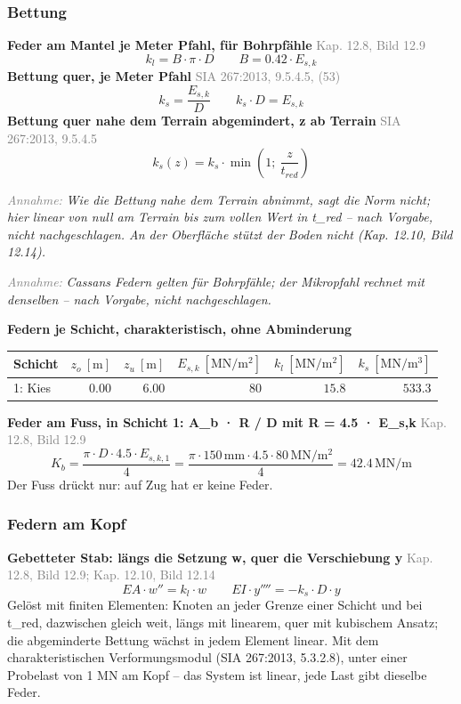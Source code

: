 \documentclass[11pt,a4paper]{article}
\newcommand{\normref}[1]{{\small\textcolor{gray}{#1}}}
\newcommand{\hinweis}[2]{\par\noindent\textcolor{gray}{\textit{#1:}} \textit{#2}\par}
\begin{document}
\subsubsection{Bettung}
\noindent\textbf{Feder am Mantel je Meter Pfahl, für Bohrpfähle} \hfill \normref{Kap. 12.8, Bild 12.9}
\begin{equation*}
k_l = B \cdot \pi \cdot D \qquad B = 0.42 \cdot E_{s,k}
\end{equation*}
\noindent\textbf{Bettung quer, je Meter Pfahl} \hfill \normref{SIA 267:2013, 9.5.4.5, (53)}
\begin{equation*}
k_s = \frac{E_{s,k}}{D} \qquad k_s \cdot D = E_{s,k}
\end{equation*}
\noindent\textbf{Bettung quer nahe dem Terrain abgemindert, z ab Terrain} \hfill \normref{SIA 267:2013, 9.5.4.5}
\begin{equation*}
k_s(z) = k_s \cdot \min\left(1;\ \frac{z}{t_{red}}\right)
\end{equation*}
\hinweis{Annahme}{Wie die Bettung nahe dem Terrain abnimmt, sagt die Norm nicht; hier linear von null am Terrain bis zum vollen Wert in t\_red -- nach Vorgabe, nicht nachgeschlagen. An der Oberfläche stützt der Boden nicht (Kap. 12.10, Bild 12.14).}
\hinweis{Annahme}{Cassans Federn gelten für Bohrpfähle; der Mikropfahl rechnet mit denselben -- nach Vorgabe, nicht nachgeschlagen.}
\noindent\textbf{Federn je Schicht, charakteristisch, ohne Abminderung}
\begin{longtable}{lrrrrr}
\hline
Schicht & $z_o\ [\mathrm{m}]$ & $z_u\ [\mathrm{m}]$ & $E_{s,k}\ [\mathrm{MN/m^2}]$ & $k_l\ [\mathrm{MN/m^2}]$ & $k_s\ [\mathrm{MN/m^3}]$ \\
\hline
\endhead
1: Kies & $0.00$ & $6.00$ & $80$ & $15.8$ & $533.3$ \\
\hline
\end{longtable}
\noindent\textbf{Feder am Fuss, in Schicht 1: A\_b · R / D mit R = 4.5 · E\_s,k} \hfill \normref{Kap. 12.8, Bild 12.9}
\begin{equation*}
K_b = \frac{\pi \cdot D \cdot 4.5 \cdot E_{s,k,1}}{4} = \frac{\pi \cdot 150\,\mathrm{mm} \cdot 4.5 \cdot 80\,\mathrm{MN}/\mathrm{m}^{2}}{4} = 42.4\,\mathrm{MN}/\mathrm{m}
\end{equation*}
Der Fuss drückt nur: auf Zug hat er keine Feder.

\subsubsection{Federn am Kopf}
\noindent\textbf{Gebetteter Stab: längs die Setzung w, quer die Verschiebung y} \hfill \normref{Kap. 12.8, Bild 12.9; Kap. 12.10, Bild 12.14}
\begin{equation*}
EA \cdot w'' = k_l \cdot w \qquad EI \cdot y'''' = -k_s \cdot D \cdot y
\end{equation*}
Gelöst mit finiten Elementen: Knoten an jeder Grenze einer Schicht und bei t\_red, dazwischen gleich weit, längs mit linearem, quer mit kubischem Ansatz; die abgeminderte Bettung wächst in jedem Element linear. Mit dem charakteristischen Verformungsmodul (SIA 267:2013, 5.3.2.8), unter einer Probelast von 1 MN am Kopf -- das System ist linear, jede Last gibt dieselbe Feder.
\end{document}
